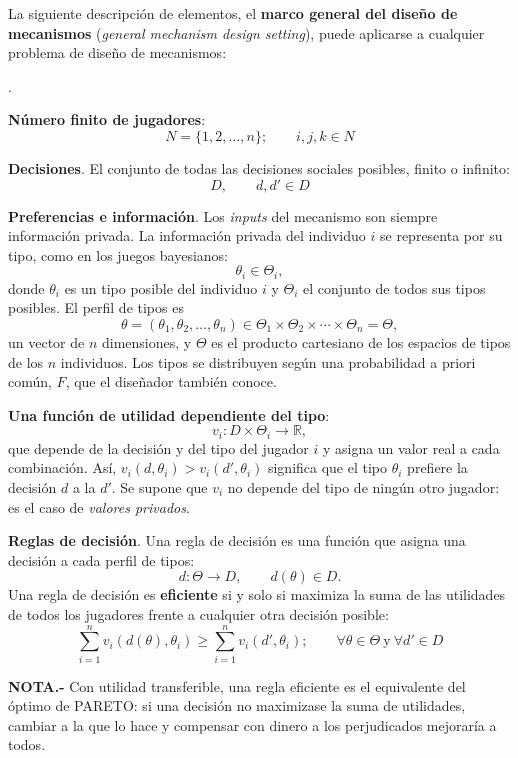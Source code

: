 \documentclass[10pt,a4paper]{article}
\newcounter{numitem}
\newenvironment{lnum}
      {\begin{list}{\arabic{numitem}.}{%
          \usecounter{numitem}%
          \setlength{\leftmargin}{1cm}%
          \setlength{\parskip}{3pt}%
          \setlength{\itemsep}{0pt}%
          \setlength{\parsep}{0pt}%
      }}
      {\end{list}}
\begin{document}
La siguiente descripción de elementos, el \textbf{marco general del diseño de mecanismos} (\textit{general mechanism design setting}), puede aplicarse a cualquier problema de diseño de mecanismos:

\begin{lnum}
    \item \textbf{Número finito de jugadores}:
    $$N=\{1,2,\ldots,n\};\qquad i,j,k\in N$$
    \item \textbf{Decisiones}. El conjunto de todas las decisiones sociales posibles, finito o infinito:
    $$D,\qquad d,d'\in D$$
    \item \textbf{Preferencias e información}. Los \textit{inputs} del mecanismo son siempre información privada. La información privada del individuo $i$ se representa por su tipo, como en los juegos bayesianos:
    $$\theta_i\in\Theta_i,$$
    donde $\theta_i$ es un tipo posible del individuo $i$ y $\Theta_i$ el conjunto de todos sus tipos posibles. El perfil de tipos es
    $$\theta=(\theta_1,\theta_2,\ldots,\theta_n)\in\Theta_1\times\Theta_2\times\cdots\times\Theta_n=\Theta,$$
    un vector de $n$ dimensiones, y $\Theta$ es el producto cartesiano de los espacios de tipos de los $n$ individuos. Los tipos se distribuyen según una probabilidad a priori común, $F$, que el diseñador también conoce.
    \item \textbf{Una función de utilidad dependiente del tipo}:
    $$v_i:D\times\Theta_i\rightarrow\mathbb{R},$$
    que depende de la decisión y del tipo del jugador $i$ y asigna un valor real a cada combinación. Así, $v_i(d,\theta_i)>v_i(d',\theta_i)$ significa que el tipo $\theta_i$ prefiere la decisión $d$ a la $d'$. Se supone que $v_i$ no depende del tipo de ningún otro jugador: es el caso de \textit{valores privados}.
    \item \textbf{Reglas de decisión}. Una regla de decisión es una función que asigna una decisión a cada perfil de tipos:
    $$d:\Theta\rightarrow D,\qquad d(\theta)\in D.$$
    Una regla de decisión es \textbf{eficiente} si y solo si maximiza la suma de las utilidades de todos los jugadores frente a cualquier otra decisión posible:
    $$\sum_{i=1}^{n}v_i\left(d(\theta),\theta_i\right)\geq\sum_{i=1}^{n}v_i\left(d',\theta_i\right);\qquad\forall\theta\in\Theta\ \text{y}\ \forall d'\in D$$
\end{lnum}

\textbf{NOTA.-} Con utilidad transferible, una regla eficiente es el equivalente del óptimo de PARETO: si una decisión no maximizase la suma de utilidades, cambiar a la que lo hace y compensar con dinero a los perjudicados mejoraría a todos.
\end{document}
